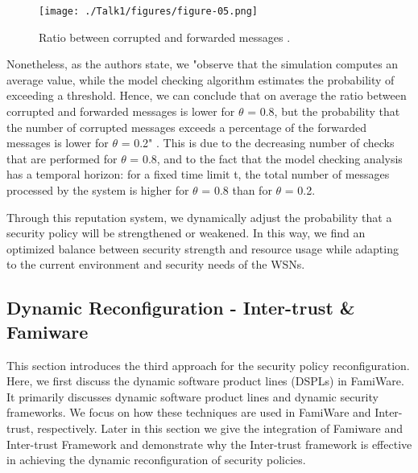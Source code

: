 \documentclass[12pt,a4paper,twoside]{report}
\begin{document}
\begin{figure}[ht]
	\begin{center}
  \texttt{[image: ./Talk1/figures/figure-05.png]}
  \end{center}
  \caption{Ratio between corrupted and forwarded messages \cite{vigo;etal:2014}.}
  \label{fig:05}
\end{figure}
Nonetheless, as the authors state, we "observe that the simulation computes an average value, while the model checking algorithm estimates the probability of exceeding a threshold. Hence, we can conclude that on average the ratio between corrupted and forwarded messages is lower for $\theta$ = 0.8, but the probability that the number of corrupted messages exceeds a percentage of the forwarded messages is lower for $\theta$ = 0.2" \cite{vigo;etal:2014}. This is due to the decreasing number of checks that are performed for $\theta$ = 0.8, and to the fact that the model checking analysis has a temporal horizon: for a fixed time limit t, the total number of messages processed by the system is higher for $\theta$ = 0.8 than for $\theta$ = 0.2.\par
Through this reputation system, we dynamically adjust the probability that a security policy will be strengthened or weakened. In this way, we find an optimized balance between security strength and resource usage while adapting to the current environment and security needs of the WSNs. \par

\subsection{Dynamic Reconfiguration - Inter-trust \& Famiware}
This section introduces the third approach for the security policy reconfiguration. Here, we first discuss the dynamic software product lines (DSPLs) in FamiWare. It primarily discusses dynamic software product lines and dynamic security frameworks. We focus on how these techniques are used in FamiWare and Inter-trust, respectively. Later in this section we give the integration of Famiware and Inter-trust Framework and demonstrate why the Inter-trust framework is effective in achieving the dynamic reconfiguration of security policies. 
\end{document}

